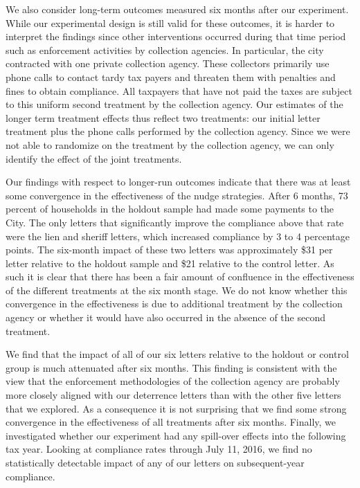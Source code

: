 \documentclass[12pt]{article}
\begin{document}
We also consider long-term outcomes measured six months after our
experiment. While our experimental design is still valid for these
outcomes, it is harder to interpret the findings since other
interventions occurred during that time period such as enforcement
activities by collection agencies. In particular, the city contracted with one
private collection agency. These collectors primarily use phone calls to
contact tardy tax payers and threaten them with penalties and fines to
obtain compliance. All taxpayers that have not paid the taxes are
subject to this uniform second treatment by the collection
agency.  Our estimates of the longer term treatment effects thus
reflect two treatments: our initial letter treatment plus the phone
calls performed by the collection agency. Since we were not able to
randomize on the treatment by the collection agency, we can only
identify the effect of the joint treatments.

Our findings with respect to longer-run outcomes indicate that there
was at least some convergence in the effectiveness of the nudge
strategies. After 6 months, 73 percent of households in the holdout
sample had made some payments to the City. The only letters that
significantly improve the compliance above that rate were the lien and
sheriff letters, which increased compliance by 3 to 4 percentage
points. The six-month impact of these two letters was approximately
\$31 per letter relative to the holdout sample and \$21 relative to
the control letter. As such it is clear that there has been a fair amount of confluence in the
effectiveness of the different treatments at the six month stage. We
do not know whether this convergence in the effectiveness is due to
additional treatment by the collection agency or whether it
would have also occurred in the absence of the second
treatment.

We find that the impact of all of our six letters relative to the holdout or
control group is much attenuated after six months. This finding is
consistent with the view that the enforcement methodologies of the
collection agency are probably more closely aligned with our
deterrence letters than with the other five letters that we
explored. As a consequence it is not surprising that we find some
strong convergence in the effectiveness of all treatments after six
months. Finally, we investigated whether our experiment had any spill-over
effects into the following tax year. Looking at compliance rates through
July 11, 2016, we find no statistically detectable impact of any of our letters on
subsequent-year compliance.
\end{document}
